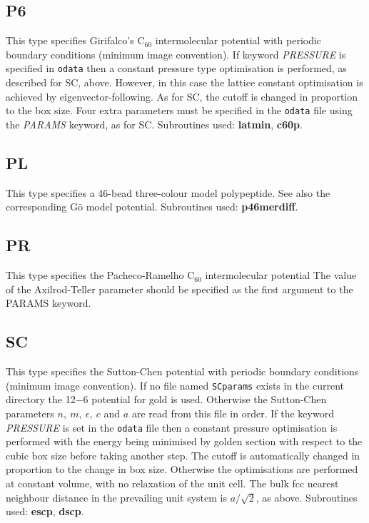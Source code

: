 \documentclass[12pt,a4paper,dvips]{article}
\def\mydash{${-}$}
\begin{document}
\subsection{P6}This type specifies Girifalco's C$_{60}$ intermolecular potential\cite{girifalco92}
with periodic boundary conditions (minimum image convention\cite{allent87}). If keyword
{\it PRESSURE\/} is specified in {\tt odata}
then a constant pressure type optimisation is performed,
as described for SC, above. However, in this case the lattice constant optimisation is
achieved by eigenvector-following. As for SC, the cutoff is changed in proportion to
the box size. Four extra parameters must be specified in the {\tt odata} file using the
{\it PARAMS\/} keyword,
as for SC. Subroutines used: {\bf latmin}, {\bf c60p}.

\subsection{PL}This type specifies a 46-bead three-colour model polypeptide. 
See also the corresponding G\={o} model potential.
Subroutines used: {\bf p46merdiff}.

\subsection{PR}This type specifies the Pacheco-Ramelho C$_{60}$ intermolecular potential\cite{pachecor97}
The value of the Axilrod-Teller parameter should be specified as the first argument to the
PARAMS keyword.

\subsection{SC}This type specifies the Sutton-Chen potential\cite{suttonc90} with periodic boundary
conditions (minimum image convention\cite{allent87}). 
If no file named {\tt SCparams} exists in the current 
directory the 12\mydash6 potential for gold is used. Otherwise the Sutton-Chen
parameters $n,\ m,\ \epsilon,\ c$ and $a$ are read from this file in order. If the
keyword {\it PRESSURE\/} is set in the {\tt odata} file
then a constant pressure optimisation is performed
with the energy being minimised by golden section with respect to the cubic box size before taking another
step. The cutoff is automatically changed in proportion to the change in box size.
Otherwise the optimisations are performed at constant volume, with no relaxation of the
unit cell. The bulk fcc nearest neighbour distance in the prevailing unit system is $a/\sqrt{2}$,
as above.
Subroutines used: {\bf escp}, {\bf dscp}.
\end{document}
